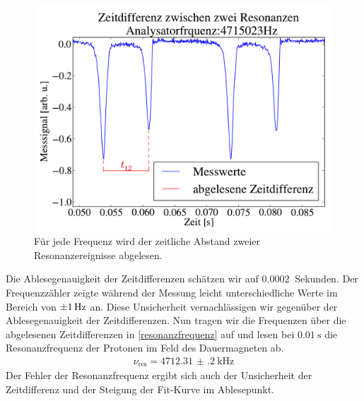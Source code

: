 \documentclass[paper=a4,
	fontsize=10pt,
	DIV=18,
	twocolumn,
	parskip=half
	]{scrartcl}
\numberwithin{equation}{section}    %
\begin{document}
\begin{figure}[htp]
	\begin{center}
		\includegraphics[width=\columnwidth]{Data-Plots/02-Zeitabstaende.pdf}
		\caption{Für jede Frequenz wird der zeitliche Abstand zweier Resonanzereignisse abgelesen.}
		\label{t12}
	\end{center}
\end{figure}
Die Ablesegenauigkeit der Zeitdifferenzen schätzen wir auf $\SI{0.0002}{}$ Sekunden. 
Der Frequenzzähler zeigte während der Messung leicht unterschiedliche Werte im Bereich von $\SI{\pm 1}{\hertz}$ an.
Diese Unsicherheit vernachlässigen wir gegenüber der Ablesegenauigkeit der Zeitdifferenzen.
Nun tragen wir die Frequenzen über die abgelesenen Zeitdifferenzen  in \cref{resonanzfrequenz} auf und lesen bei $\SI{0.01}{\second}$ die Resonanzfrequenz der Protonen im Feld des Dauermagneten ab.
\begin{align}
	\nu_{\mathrm{res}}=\SI{4712.31(20)}{\kilo\hertz}
\end{align}
Der Fehler der Resonanzfrequenz ergibt sich auch der Unsicherheit der Zeitdifferenz und der Steigung der Fit-Kurve im Ablesepunkt.
\end{document}

